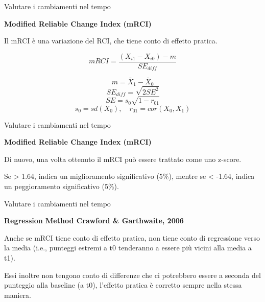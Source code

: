 \documentclass[
  ignorenonframetext,
]{beamer}
\begin{document}
\begin{frame}{Valutare i cambiamenti nel tempo}
\label{valutare-i-cambiamenti-nel-tempo-11}
\begin{center}
\textbf{Modified Reliable Change Index (mRCI)}
\end{center}
\vspace{2em}

Il mRCI è una variazione del RCI, che tiene conto di effetto pratica.

\[
mRCI = \frac{(X_{i1}-X_{i0})-m}{SE_{diff}}
\]

\small

\[m = \bar{X}_1 - \bar{X}_0\] \[SE_{diff} = \sqrt{2SE^2}\]
\[SE = s_0\sqrt{1-r_{01}}\]
\[s_0 = sd(X_0), \quad r_{01} = cor(X_0, X_1)\]
\end{frame}

\begin{frame}{Valutare i cambiamenti nel tempo}
\label{valutare-i-cambiamenti-nel-tempo-12}
\begin{center}
\textbf{Modified Reliable Change Index (mRCI)}
\end{center}
\vspace{2em}

Di nuovo, una volta ottenuto il mRCI può essere trattato come uno
z-score.

Se \textgreater{} 1.64, indica un miglioramento significativo (5\%),
mentre se \textless{} -1.64, indica un peggioramento significativo
(5\%).
\end{frame}

\begin{frame}{Valutare i cambiamenti nel tempo}
\label{valutare-i-cambiamenti-nel-tempo-13}
\begin{center}
\textbf{Regression Method Crawford \& Garthwaite, 2006}
\end{center}
\vspace{2em}

Anche se mRCI tiene conto di effetto pratica, non tiene conto di
regressione verso la media (i.e., punteggi estremi a t0 tenderanno a
essere più vicini alla media a t1).

Essi inoltre non tengono conto di differenze che ci potrebbero essere a
seconda del punteggio alla baseline (a t0), l'effetto pratica è corretto
sempre nella stessa maniera.
\end{frame}
\end{document}

